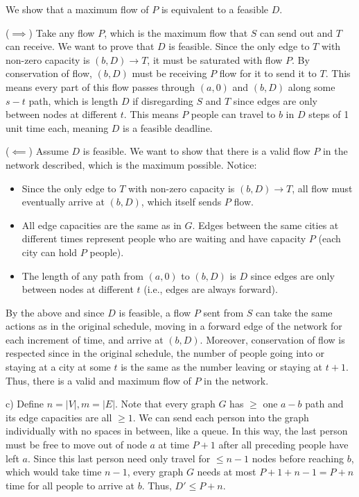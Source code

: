 \documentclass[11pt]{article}
\begin{document}
We show that a maximum flow of $P$ is equivalent to a feasible $D$.

($\implies$) Take any flow $P$, which is the maximum flow that $S$ can send out and $T$ can receive. We want to prove that $D$ is feasible. Since the only edge to $T$ with non-zero capacity is $(b,D)\to T$, it must be saturated with flow $P$. By conservation of flow, $(b,D)$ must be receiving $P$ flow for it to send it to $T$. This means every part of this flow passes through $(a,0)$ and $(b,D)$ along some $s-t$ path, which is length $D$ if disregarding $S$ and $T$ since edges are only between nodes at different $t$. This means $P$ people can travel to $b$ in $D$ steps of 1 unit time each, meaning $D$ is a feasible deadline.

($\impliedby$) Assume $D$ is feasible. We want to show that there is a valid flow $P$ in the network described, which is the maximum possible. Notice:

\begin{itemize}
    \item Since the only edge to $T$ with non-zero capacity is $(b,D)\to T$, all flow must eventually arrive at $(b,D)$, which itself sends $P$ flow.
    \item All edge capacities are the same as in $G$. Edges between the same cities at different times represent people who are waiting and have capacity $P$ (each city can hold $P$ people).
    \item The length of any path from $(a,0)$ to $(b,D)$ is $D$ since edges are only between nodes at different $t$ (i.e., edges are always forward).
\end{itemize}

By the above and since $D$ is feasible, a flow $P$ sent from $S$ can take the same actions as in the original schedule, moving in a forward edge of the network for each increment of time, and arrive at $(b,D)$. Moreover, conservation of flow is respected since in the original schedule, the number of people going into or staying at a city at some $t$ is the same as the number leaving or staying at $t+1$. Thus, there is a valid and maximum flow of $P$ in the network.

c) Define $n=|V|,m=|E|$. Note that every graph $G$ has $\geq$ one $a-b$ path and its edge capacities are all $\geq 1$. We can send each person into the graph individually with no spaces in between, like a queue. In this way, the last person must be free to move out of node $a$ at time $P+1$ after all preceding people have left $a$. Since this last person need only travel for $\leq n-1$ nodes before reaching $b$, which would take time $n-1$, every graph $G$ needs at most $P+1+n-1=P+n$ time for all people to arrive at $b$. Thus, $D'\leq P+n$.
\end{document}
